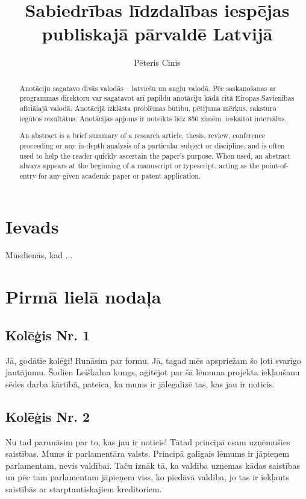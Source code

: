 \documentclass{LU-nosleguma}
\title{Sabiedrības līdzdalības iespējas publiskajā pārvaldē Latvijā}
\author{Pēteris Cinis}
\begin{document}
\maketitle
\pagestyle{empty}

\begin{abstract}
Anotāciju sagatavo divās valodās – latviešu un angļu valodā. Pēc saskaņošanas ar programmas 
direktoru var sagatavot arī papildu anotāciju kādā citā Eiropas Savienības oficiālajā valodā. 
Anotācijā izklāsta problēmas būtību, pētījuma mērķus, raksturo iegūtos rezultātus. 
Anotācijas apjoms ir noteikts līdz 850 zīmēm, ieskaitot intervālus.
\end{abstract}
\clearpage

\begin{abstract}
An abstract is a brief summary of a research article, thesis, review, conference proceeding or any 
in-depth analysis of a particular subject or discipline, and is often used to help the reader quickly 
ascertain the paper's purpose. When used, an abstract always appears at the beginning of a 
manuscript or typescript, acting as the point-of-entry for any given academic paper or 
patent application. 
\end{abstract}
\clearpage

\pagestyle{plain}


\tableofcontents


\section*{Ievads}
Mūsdienās, kad ... \cite{darktome}


\section {Pirmā lielā nodaļa}
\subsection {Kolēģis Nr. 1}
Jā, godātie kolēģi! Runāsim par formu. Jā, tagad mēs apspriežam šo ļoti svarīgo jautājumu. Šodien Leiškalna kungs, 
aģitējot par šā lēmuma projekta iekļaušanu sēdes darba kārtībā, pateica, ka mums ir jālegalizē tas, kas jau ir noticis.

\subsection {Kolēģis Nr. 2}
Nu tad parunāsim par to, kas jau ir noticis! Tātad principā esam uzņēmušies saistības. Mums ir parlamentāra valsts.
Principā galīgais lēmums ir jāpieņem parlamentam, nevis valdībai. Taču iznāk tā, ka valdība uzņemas kādas saistības 
un pēc tam parlamentam jāpieņem viss, ko piedāvā valdība, jo tas ir iekļauts saistībās ar starptautiskajiem kreditoriem.
\end{document}
